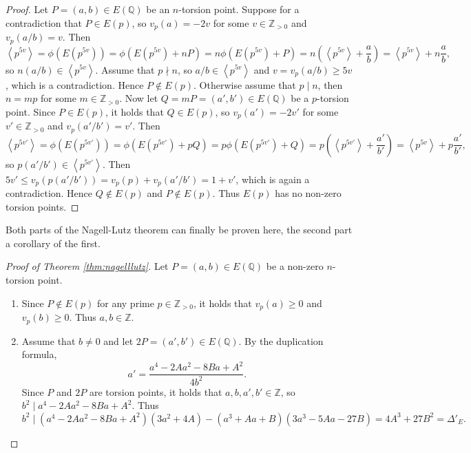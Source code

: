 \documentclass{article}
\newcommand{\Z}{\mathbb{Z}}
\newcommand{\Q}{\mathbb{Q}}
\newcommand{\rb}[1]{\left( #1 \right)}
\newcommand{\ab}[1]{\left\langle #1 \right\rangle}
\theoremstyle{definition}\newtheorem*{definition}{Definition}
\theoremstyle{definition}\newtheorem*{example}{Example}
\theoremstyle{definition}\newtheorem*{remark}{Remark}
\begin{document}
\begin{proof}
Let $ P = \rb{a, b} \in E\rb{\Q} $ be an $ n $-torsion point. Suppose for a contradiction that $ P \in E\rb{p} $, so $ v_p\rb{a} = -2v $ for some $ v \in \Z_{> 0} $ and $ v_p\rb{a / b} = v $. Then
$$ \ab{p^{5v}} = \phi\rb{E\rb{p^{5v}}} = \phi\rb{E\rb{p^{5v}} + nP} = n\phi\rb{E\rb{p^{5v}} + P} = n\rb{\ab{p^{5v}} + \dfrac{a}{b}} = \ab{p^{5v}} + n\dfrac{a}{b}, $$
so $ n\rb{a / b} \in \ab{p^{5v}} $. Assume that $ p \nmid n $, so $ a / b \in \ab{p^{5v}} $ and $ v = v_p\rb{a / b} \ge 5v $, which is a contradiction. Hence $ P \notin E\rb{p} $. Otherwise assume that $ p \mid n $, then $ n = mp $ for some $ m \in \Z_{> 0} $. Now let $ Q = mP = \rb{a', b'} \in E\rb{\Q} $ be a $ p $-torsion point. Since $ P \in E\rb{p} $, it holds that $ Q \in E\rb{p} $, so $ v_p\rb{a'} = -2v' $ for some $ v' \in \Z_{> 0} $ and $ v_p\rb{a' / b'} = v' $. Then
$$ \ab{p^{5v'}} = \phi\rb{E\rb{p^{5v'}}} = \phi\rb{E\rb{p^{5v'}} + pQ} = p\phi\rb{E\rb{p^{5v'}} + Q} = p\rb{\ab{p^{5v'}} + \dfrac{a'}{b'}} = \ab{p^{5v}} + p\dfrac{a'}{b'}, $$
so $ p\rb{a' / b'} \in \ab{p^{5v'}} $. Then $ 5v' \le v_p\rb{p\rb{a' / b'}} = v_p\rb{p} + v_p\rb{a' / b'} = 1 + v' $, which is again a contradiction. Hence $ Q \notin E\rb{p} $ and $ P \notin E\rb{p} $. Thus $ E\rb{p} $ has no non-zero torsion points.
\end{proof}

Both parts of the Nagell-Lutz theorem can finally be proven here, the second part a corollary of the first.

\begin{proof}[Proof of Theorem \ref{thm:nagelllutz}]
Let $ P = \rb{a, b} \in E\rb{\Q} $ be a non-zero $ n $-torsion point.
\begin{enumerate}
\item Since $ P \notin E\rb{p} $ for any prime $ p \in \Z_{> 0} $, it holds that $ v_p\rb{a} \ge 0 $ and $ v_p\rb{b} \ge 0 $. Thus $ a, b \in \Z $.
\item Assume that $ b \ne 0 $ and let $ 2P = \rb{a', b'} \in E\rb{\Q} $. By the duplication formula,
$$ a' = \dfrac{a^4 - 2Aa^2 - 8Ba + A^2}{4b^2}. $$
Since $ P $ and $ 2P $ are torsion points, it holds that $ a, b, a', b' \in \Z $, so $ b^2 \mid a^4 - 2Aa^2 - 8Ba + A^2 $. Thus
$$ b^2 \mid \rb{a^4 - 2Aa^2 - 8Ba + A^2}\rb{3a^2 + 4A} - \rb{a^3 + Aa + B}\rb{3a^3 - 5Aa - 27B} = 4A^3 + 27B^2 = \Delta'_E. $$
\end{enumerate}
\end{proof}

\pagebreak
\end{document}
